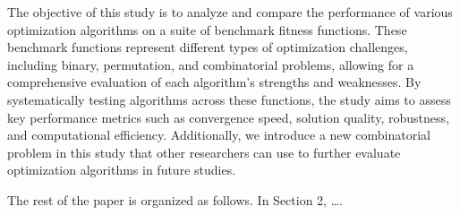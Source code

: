 The objective of this study is to analyze and compare the performance of various optimization algorithms on a suite of benchmark fitness functions. These benchmark functions represent different types of optimization challenges, including binary, permutation, and combinatorial problems, allowing for a comprehensive evaluation of each algorithm's strengths and weaknesses. By systematically testing algorithms across these functions, the study aims to assess key performance metrics such as convergence speed, solution quality, robustness, and computational efficiency. Additionally, we introduce a new combinatorial problem in this study that other researchers can use to further evaluate optimization algorithms in future studies.

The rest of the paper is organized as follows. In Section 2, ….
